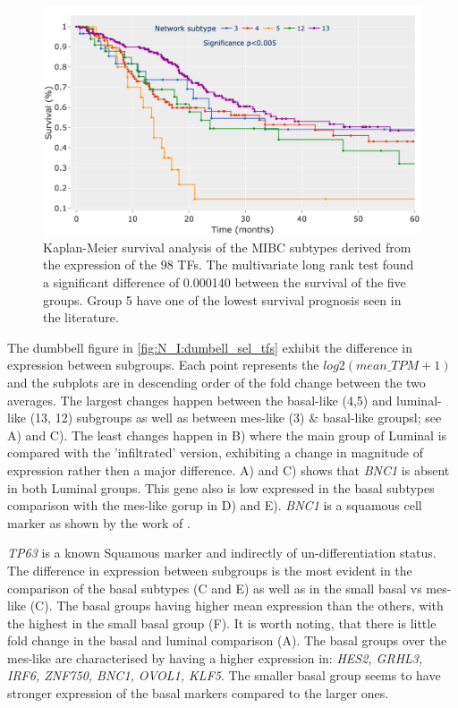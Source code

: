 \begin{figure}[!t]
    \centering
    \includegraphics[width=1.0\textwidth,keepaspectratio]{Sections/Network_I/Resources/selective_pruning/sel_tfs/survival_sel_tfs_cs.png}
    \caption{Kaplan-Meier survival analysis of the MIBC subtypes derived from the expression of the 98 TFs. The multivariate long rank test found a significant difference of 0.000140 between the survival of the five groups. Group 5 have one of the lowest survival prognosis seen in the literature. }
    \label{fig:N_I:sel_tfs_survival}
\end{figure} 


The dumbbell figure in \cref{fig:N_I:dumbell_sel_tfs} exhibit the difference in expression between subgroups. Each point represents the $log2(mean\_TPM+1)$ and the subplots are in descending order of the fold change between the two averages. The largest changes happen between the basal-like (4,5) and luminal-like (13, 12) subgroups as well as between mes-like (3) \& basal-like groupsl; see A) and C). The least changes happen in B) where the main group of Luminal is compared with the 'infiltrated' version, exhibiting a change in magnitude of expression rather then a major difference.   A) and C) shows that \textit{BNC1} is absent in both Luminal groups. This gene also is low expressed in the basal subtypes comparison with the mes-like gorup in D) and E). \textit{BNC1} is a squamous cell marker as shown by the work of \citet{Hurst2022-sp}.

\textit{TP63} is a known Squamous marker \citet{Robertson2023-na} and indirectly of un-differentiation status. The difference in expression between subgroups is the most evident in the comparison of the basal subtypes (C and E) as well as in the small basal vs mes-like (C). The basal groups having higher mean expression than the others, with the highest in the small basal group (F). It is worth noting, that there is little fold change in the basal and luminal comparison (A). The basal groups over the mes-like are characterised by having a higher expression in: \textit{HES2, GRHL3, IRF6, ZNF750, BNC1, OVOL1, KLF5}. The smaller basal group seems to have stronger expression of the basal markers compared to the larger ones.

